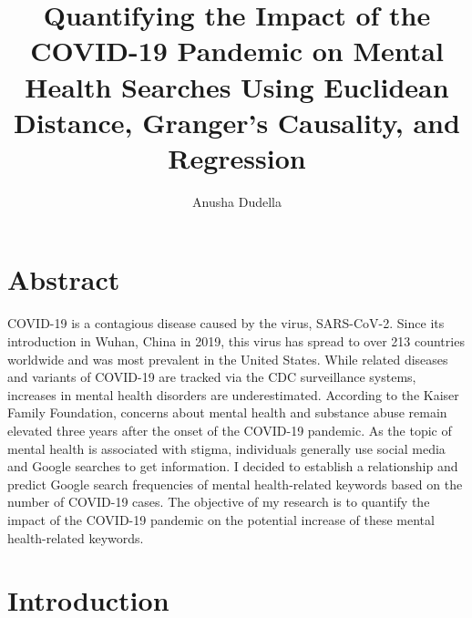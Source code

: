 \documentclass{article}
\title{Quantifying the Impact of the COVID-19 Pandemic on Mental Health Searches Using Euclidean Distance, Granger’s Causality, and Regression}
\author{Anusha Dudella}
\begin{document}
\maketitle

\section{Abstract}
COVID-19 is a contagious disease caused by the virus, SARS-CoV-2. Since its introduction in Wuhan,
China in 2019, this virus has spread to over 213 countries worldwide and was most prevalent in the
United States. While related diseases and variants of COVID-19 are tracked via the CDC surveillance
systems, increases in mental health disorders are underestimated. According to the Kaiser Family
Foundation, concerns about mental health and substance abuse remain elevated three years after the
onset of the COVID-19 pandemic. As the topic of mental health is associated with stigma, individuals
generally use social media and Google searches to get information. I decided to establish a
relationship and predict Google search frequencies of mental health-related keywords based on the
number of COVID-19 cases. The objective of my research is to quantify the impact of the COVID-19
pandemic on the potential increase of these mental health-related keywords.

\section{Introduction}
\end{document}
